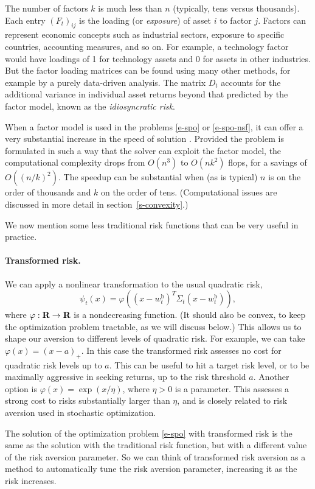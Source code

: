 \documentclass[openany]{article}  %
\newcommand{\wb}{w^\mathrm{b}}
\renewcommand{\S}{section~}
\begin{document}
The number of factors $k$ is much less than $n$
\cite{chan1999portfolio} (typically, tens versus thousands).
Each entry $(F_t)_{ij}$ is the loading (or \emph{exposure}) of asset $i$ to factor $j$.
Factors can represent economic concepts such as industrial sectors,
exposure to specific countries, accounting measures, and so on.
For example, a technology factor would have loadings of 1 for technology assets
and 0 for assets in other industries.
But the factor loading matrices can be found using many other methods,
for example by a purely data-driven analysis.
The matrix $D_t$ accounts for the additional variance in individual asset returns
beyond that predicted by the factor model, known as the
\emph{idiosyncratic risk}.

When a factor model is used in the problems \eqref{e-spo} or \eqref{e-spo-nsf},
it can offer a very substantial increase in the speed of solution
\cite{perold1984large,boyd2004convex}.
Provided the problem is formulated in such a way that the solver
can exploit the factor model, the computational complexity drops from
$O(n^3)$ to $O(nk^2)$ flops, for a savings of $O((n/k)^2)$.
The speedup can be substantial when
(as is typical) $n$ is on the order of thousands
and $k$ on the order of tens.
(Computational issues are discussed in more detail in \S\ref{s-convexity}.)

We now mention some less traditional risk functions that can be very useful
in practice.

\paragraph{Transformed risk.}
We can apply a nonlinear transformation to the usual quadratic risk,
\[
\psi_t(x) = \varphi((x-\wb_t)^T \Sigma_t (x-\wb_t)),
\]
where $\varphi:{\mbox{\bf R}} \to {\mbox{\bf R}}$ is a nondecreasing function.
(It should also be convex, to keep the optimization problem
tractable, as we will discuss below.)
This allows us to shape our aversion to different levels of
quadratic risk. For example, we can take $\varphi(x) = (x-a)_+$.  In this case
the transformed risk assesses no cost for quadratic risk levels up to $a$.
This can be useful to hit a target risk level, or to be maximally aggressive
in seeking returns, up to the risk threshold $a$.
Another option is $\varphi(x) = \exp (x/\eta)$, where $\eta>0$ is a parameter.
This assesses a strong cost to risks substantially larger than $\eta$, and is
closely related to risk aversion used in stochastic optimization.

The solution of the optimization problem \eqref{e-spo} with transformed
risk is the same as the solution with the traditional risk function, but with a
different value of the risk aversion parameter.  So we can think of transformed
risk aversion as a method to automatically tune the risk aversion parameter,
increasing it as the risk increases.
\end{document}
